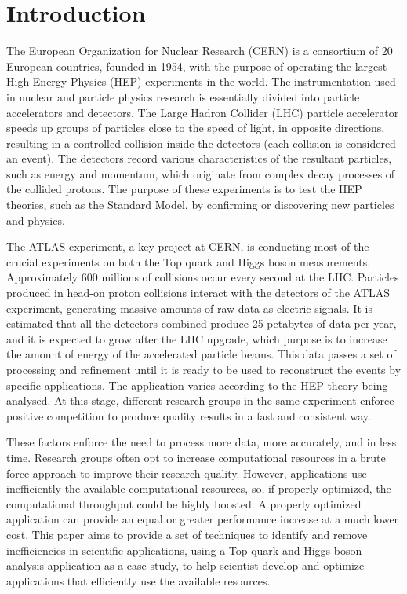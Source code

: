 \section{Introduction}
\label{introduction}

The European Organization for Nuclear Research (CERN) is a consortium of 20 European countries, founded in 1954, with the purpose of operating the largest High Energy Physics (HEP) experiments in the world. The instrumentation used in nuclear and particle physics research is essentially divided into particle accelerators and detectors. The Large Hadron Collider (LHC) particle accelerator speeds up groups of particles close to the speed of light, in opposite directions, resulting in a controlled collision inside the detectors (each collision is considered an event). The detectors record various characteristics of the resultant particles, such as energy and momentum, which originate from complex decay processes of the collided protons. The purpose of these experiments is to test the HEP theories, such as the Standard Model, by confirming or discovering new particles and physics.

The ATLAS experiment, a key project at CERN, is conducting most of the crucial experiments on both the Top quark and Higgs boson measurements. Approximately 600 millions of collisions occur every second at the LHC. Particles produced in head-on proton collisions interact with the detectors of the ATLAS experiment, generating massive amounts of raw data as electric signals. It is estimated that all the detectors combined produce 25 petabytes of data per year, and it is expected to grow after the LHC upgrade, which purpose is to increase the amount of energy of the accelerated particle beams. This data passes a set of processing and refinement until it is ready to be used to reconstruct the events by specific applications. The application varies according to the HEP theory being analysed. At this stage, different research groups in the same experiment enforce positive competition to produce quality results in a fast and consistent way.

These factors enforce the need to process more data, more accurately, and in less time. Research groups often opt to increase computational resources in a brute force approach to improve their research quality. However, applications use inefficiently the available computational resources, so, if properly optimized, the computational throughput could be highly boosted. A properly optimized application can provide an equal or greater performance increase at a much lower cost. This paper aims to provide a set of techniques to identify and remove inefficiencies in scientific applications, using a Top quark and Higgs boson analysis application as a case study, to help scientist develop and optimize applications that efficiently use the available resources.


